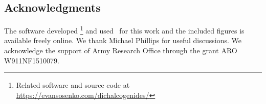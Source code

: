 \begin{acknowledgments}
  \section{Acknowledgments}

  The software developed %
\footnote{%
  Related software and source code at \\
  \url{https://evansosenko.com/dichalcogenides/}
}
  and used~\cite{Hunter:2007} for this work
  and the included figures is available freely online.
  We thank Michael Phillips for useful discussions.
  We acknowledge the support of Army Research Office through the grant
  ARO W911NF1510079.
\end{acknowledgments}
